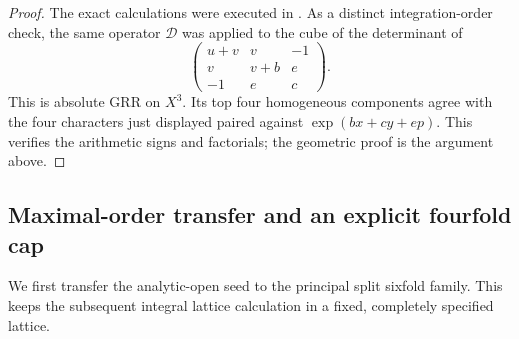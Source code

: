 \begin{proof}
The exact calculations were executed in
.
As a distinct integration-order check, the same operator
$\mathcal D$ was applied to the cube of the determinant of
\[
 \begin{pmatrix}
 u+v&v&-1\\
 v&v+b&e\\
 -1&e&c
 \end{pmatrix}.
\]
This is absolute GRR on $X^3$. Its top four homogeneous components
agree with the four characters just displayed paired against
$\exp(bx+cy+ep)$. This verifies the arithmetic signs and factorials;
the geometric proof is the argument above.
\end{proof}

\subsection{Maximal-order transfer and an explicit fourfold cap}

We first transfer the analytic-open seed to the principal split
sixfold family. This keeps the subsequent integral lattice calculation
in a fixed, completely specified lattice.

